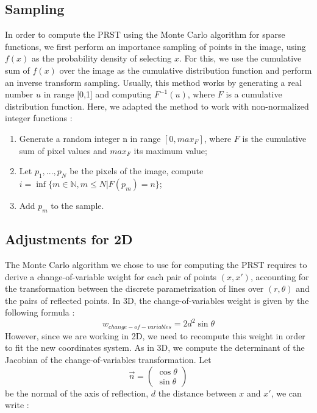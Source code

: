 \documentclass[10pt,a4paper]{article}			%
\begin{document}
	\subsection{Sampling}
In order to compute the PRST using the Monte Carlo algorithm for sparse functions, we first perform an importance sampling of points in the image, using $f(x)$  as the probability density of selecting $x$. For this, we use the cumulative sum of $f(x)$ over the image as the cumulative distribution function and perform an inverse transform sampling. Usually, this method works by generating a real number $u$ in range [0,1] and computing $F^{-1}(u)$, where $F$ is a cumulative distribution function. Here, we adapted the method to work with non-normalized integer functions :
\begin{enumerate}
\item Generate a random integer n in range $[0,max_F]$, where $F$ is the cumulative sum of pixel values and $max_F$ its maximum value;
\item Let $p_1,...,p_N$ be the pixels of the image, compute $i=\inf\{m\in \mathbb{N}, m\leq N |  F(p_m) = n\}$;
\item Add $p_m$ to the sample.
\end{enumerate}



	\subsection{Adjustments for 2D}
	

The Monte Carlo algorithm we chose to use for computing the PRST requires to derive a change-of-variable weight for each pair of points $(x,x')$, accounting for the transformation between the discrete parametrization of lines over $(r,\theta)$ and the pairs of reflected points. In 3D, the change-of-variables weight is given by the following formula :
\[w_{change-of-variables} = 2d^2\sin\theta\]
However, since we are working in 2D, we need to recompute this weight in order to fit the new coordinates system. As in 3D, we compute the determinant of the Jacobian of the change-of-variables transformation. Let 
\[\vec{n}=\begin{pmatrix}\cos\theta \\ \sin\theta\end{pmatrix}\]
be the normal of the axis of reflection, $d$ the distance between $x$ and $x'$, we can write :
\end{document}
